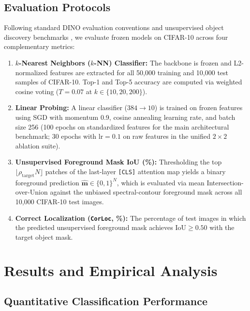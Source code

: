 \documentclass[11pt,a4paper]{article}
\begin{document}
\subsection{Evaluation Protocols}
Following standard DINO evaluation conventions \cite{caron2021emerging} and unsupervised object discovery benchmarks \cite{wang2022tokencut}, we evaluate frozen models on CIFAR-10 across four complementary metrics:
\begin{enumerate}[leftmargin=*]
    \item \textbf{$k$-Nearest Neighbors ($k$-NN) Classifier:} The backbone is frozen and L2-normalized features are extracted for all 50,000 training and 10,000 test samples of CIFAR-10. Top-1 and Top-5 accuracy are computed via weighted cosine voting ($T=0.07$ at $k \in \{10, 20, 200\}$).
    \item \textbf{Linear Probing:} A linear classifier ($384 \to 10$) is trained on frozen features using SGD with momentum 0.9, cosine annealing learning rate, and batch size 256 (100 epochs on standardized features for the main architectural benchmark; 30 epochs with $\text{lr}=0.1$ on raw features in the unified $2\times 2$ ablation suite).
    \item \textbf{Unsupervised Foreground Mask IoU (\%):} Thresholding the top $\lfloor \rho_{\text{target}} N \rfloor$ patches of the last-layer \texttt{[CLS]} attention map yields a binary foreground prediction $\hat{\mathbf{m}} \in \{0, 1\}^N$, which is evaluated via mean Intersection-over-Union against the unbiased spectral-contour foreground mask across all 10,000 CIFAR-10 test images.
    \item \textbf{Correct Localization (\texttt{CorLoc}, \%):} The percentage of test images in which the predicted unsupervised foreground mask achieves $\text{IoU} \ge 0.50$ with the target object mask.
\end{enumerate}

\section{Results and Empirical Analysis}
\label{sec:results}

\subsection{Quantitative Classification Performance}
\end{document}
